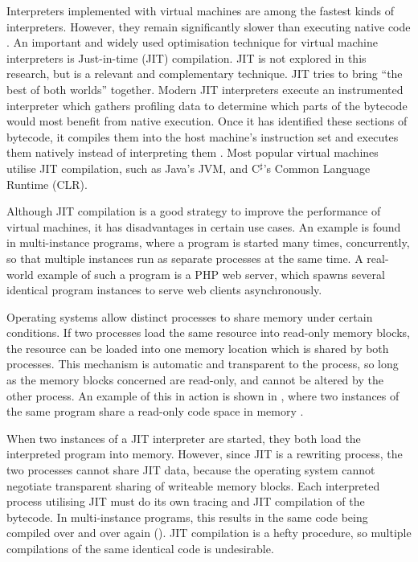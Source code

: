 		Interpreters implemented with virtual machines are among the fastest kinds of interpreters\citep{modernarchvm}. However, they remain significantly slower than executing native code \citep{optimizingindirectbranch}. An important and widely used optimisation technique for virtual machine interpreters is Just-in-time (JIT) compilation. JIT is not explored in this research, but is a relevant and complementary technique. JIT tries to bring ``the best of both worlds'' together. Modern JIT interpreters execute an instrumented interpreter which gathers profiling data to determine which parts of the bytecode would most benefit from native execution. Once it has identified these sections of bytecode, it compiles them into the host machine's instruction set and executes them natively instead of interpreting them \citep{historyjit}. Most popular virtual machines utilise JIT compilation, such as Java's JVM, and C$^\sharp$'s Common Language Runtime (CLR).
		
		Although JIT compilation is a good strategy to improve the performance of virtual machines, it has disadvantages in certain use cases. An example is found in multi-instance programs, where a program is started many times, concurrently, so that multiple instances run as separate processes at the same time. A real-world example of such a program is a PHP web server, which spawns several identical program instances to serve web clients asynchronously.
		
		Operating systems allow distinct processes to share memory under certain conditions. If two processes load the same resource into read-only memory blocks, the resource can be loaded into one memory location which is shared by both processes. This mechanism is automatic and transparent to the process, so long as the memory blocks concerned are read-only, and cannot be altered by the other process. An example of this in action is shown in , where two instances of the same program share a read-only code space in memory \citep{sharedcodepatent}. 
		
		When two instances of a JIT interpreter are started, they both load the interpreted program into memory. However, since JIT is a rewriting process, the two processes cannot share JIT data, because the operating system cannot negotiate transparent sharing of writeable memory blocks. Each interpreted process utilising JIT must do its own tracing and JIT compilation of the bytecode. In multi-instance programs, this results in the same code being compiled over and over again (). JIT compilation is a hefty procedure, so multiple compilations of the same identical code is undesirable. 
		
